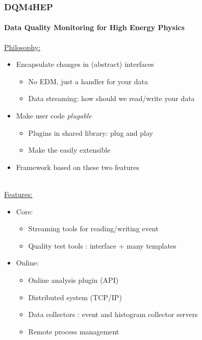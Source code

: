 \documentclass[presentation, 10pt]{beamer}
\begin{document}
\begin{frame}
  \frametitle{DQM4HEP}
  \framesubtitle{\textbf{D}ata \textbf{Q}uality \textbf{M}onitoring for \textbf{H}igh \textbf{E}nergy \textbf{P}hysics}
  \footnotesize
  \underline{Philosophy:}
  \begin{itemize}
    \item Encapsulate changes in (abstract) interfaces
    \begin{itemize}
      \scriptsize
      \item No EDM, just a handler for your data
      \item Data streaming: how should we read/write your data 
    \end{itemize}
    \item Make user code \textit{plugable}
    \begin{itemize}
      \scriptsize
      \item Plugins in shared library: plug and play
      \item Make the easily extensible
    \end{itemize}
    \item Framework based on these two features 
  \end{itemize}
  ~\\
  \underline{Features:}
  \begin{itemize}
    \item Core:
    \begin{itemize}
      \scriptsize
      \item Streaming tools for reading/writing event
      \item Quality test tools : interface + many templates
    \end{itemize}
    \item Online:
    \begin{itemize}
      \scriptsize
      \item Online analysis plugin (API)
      \item Distributed system (TCP/IP)
      \item Data collectors : event and histogram collector servers
      \item Remote process management
    \end{itemize}
  \end{itemize}

\end{frame}
\end{document}
